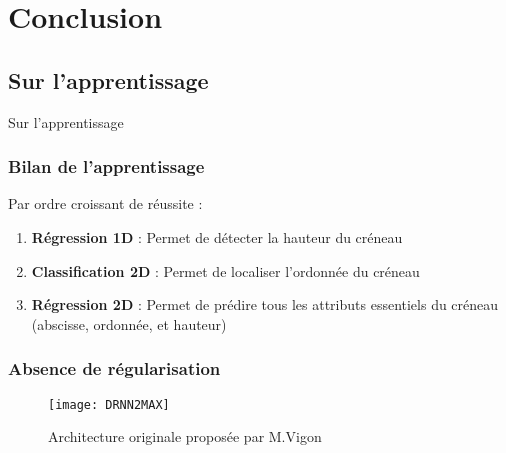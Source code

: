 
% 



\section{Conclusion}

\subsection{Sur l'apprentissage}

\begin{frame}
    \large
    \centering
    Sur l'apprentissage
\end{frame}

\begin{frame}
    \frametitle{Bilan de l'apprentissage}
    Par ordre croissant de réussite :
    \pause
    \begin{enumerate}[<+>]
        \item \textbf{Régression 1D} : Permet de détecter la hauteur du créneau %
        \item \textbf{Classification 2D} : Permet de localiser l'ordonnée du créneau %
        \item \textbf{Régression 2D} : Permet de prédire tous les attributs essentiels du créneau (abscisse, ordonnée, et hauteur)%
      \end{enumerate}
\end{frame}

\begin{frame}
    \frametitle{Absence de régularisation}
    \begin{figure}
        \texttt{[image: DRNN2MAX]}       
        \caption{Architecture originale proposée par M.Vigon}
    \end{figure}
\end{frame}

